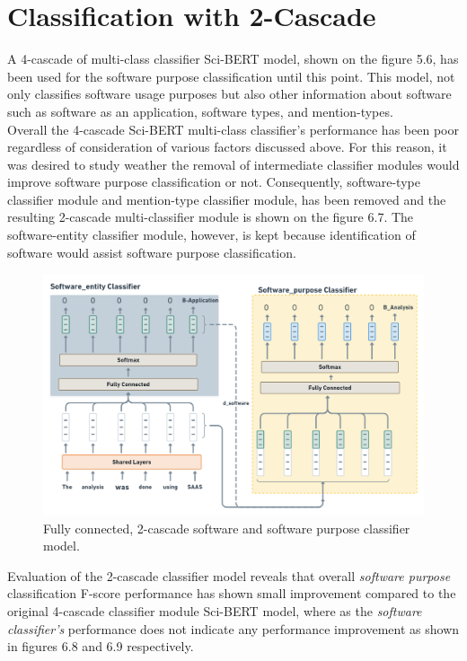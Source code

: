 \section{Classification with 2-Cascade}
\label{sec:chapter06:2lc}

A 4-cascade of multi-class classifier \ac{Sci-BERT} model, shown on the figure 5.6, has been used for the software purpose classification until this point. This model, not only classifies software usage purposes but also other information about software such as software as an application, software types, and mention-types. \\


Overall the 4-cascade \ac{Sci-BERT} multi-class classifier’s performance has been poor regardless of consideration of various factors discussed above. For this reason, it was desired to study weather the removal of intermediate classifier modules would improve software purpose classification or not. Consequently, software-type classifier module and mention-type classifier module, has been removed and the resulting 2-cascade multi-classifier module is shown on the figure 6.7. The software-entity classifier module, however, is kept because identification of software would assist software purpose classification.  \\

\begin{figure}[htbp]
	\centering
	\includegraphics[width=.78\textwidth]{4.graphics/figures/ch_5/2LC}
	\caption{Fully connected, 2-cascade software and software purpose classifier model.}
	\label{fig:chapter06:with}
\end{figure}

Evaluation of the 2-cascade classifier model reveals that overall \emph{software purpose} classification F-score performance has shown small improvement compared to the original 4-cascade classifier module  \ac{Sci-BERT} model, where as the \emph{software classifier’s} performance does not indicate any performance improvement as shown in figures 6.8 and 6.9 respectively.  

